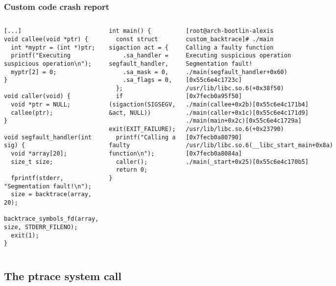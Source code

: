 \begin{frame}[fragile]
  \frametitle{Custom code crash report}
  \begin{columns}
    \begin{block}{}
      \begin{verbatim}
[...]
void callee(void *ptr) {
  int *myptr = (int *)ptr;
  printf("Executing suspicious operation\n");
  myptr[2] = 0;
}

void caller(void) {
  void *ptr = NULL;
  callee(ptr);
}

void segfault_handler(int sig) {
  void *array[20];
  size_t size;

  fprintf(stderr, "Segmentation fault!\n");
  size = backtrace(array, 20);
  backtrace_symbols_fd(array, size, STDERR_FILENO);
  exit(1);
}
      \end{verbatim}
    \end{block}
    \begin{block}{}
      \begin{verbatim}
int main() {
  const struct sigaction act = {
    .sa_handler = segfault_handler,
    .sa_mask = 0,
    .sa_flags = 0,
  };
  if (sigaction(SIGSEGV, &act, NULL))
    exit(EXIT_FAILURE);
  printf("Calling a faulty function\n");
  caller();
  return 0;
}
      \end{verbatim}
    \end{block}


    \begin{block}{}
      \begin{verbatim}
[root@arch-bootlin-alexis custom_backtrace]# ./main
Calling a faulty function
Executing suspicious operation
Segmentation fault!
./main(segfault_handler+0x60)[0x55c6e4c1723c]
/usr/lib/libc.so.6(+0x38f50)[0x7fecb0a95f50]
./main(callee+0x2b)[0x55c6e4c171b4]
./main(caller+0x1c)[0x55c6e4c171d9]
./main(main+0x2c)[0x55c6e4c1729a]
/usr/lib/libc.so.6(+0x23790)[0x7fecb0a80790]
/usr/lib/libc.so.6(__libc_start_main+0x8a)[0x7fecb0a8084a]
./main(_start+0x25)[0x55c6e4c170b5]
      \end{verbatim}
    \end{block}
  \end{columns}
\end{frame}

\subsection{The ptrace system call}


